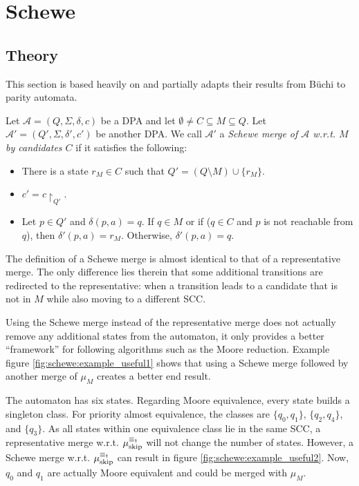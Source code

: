 
\chapter{Schewe}
\label{chap:schewe}

\section{Theory}

This section is based heavily on \cite{Schewe2010} and partially adapts their results from B\"uchi to parity automata.

\begin{defn}
		Let $\mathcal{A} = (Q, \Sigma, \delta, c)$ be a DPA and let $\emptyset \neq C \subseteq M \subseteq Q$. Let $\mathcal{A}' = (Q', \Sigma, \delta', c')$ be another DPA. We call $\mathcal{A}'$ a \emph{Schewe merge of $\mathcal{A}$ w.r.t. $M$ by candidates $C$} if it satisfies the following:
	\begin{itemize}
		\item There is a state $r_M \in C$ such that $Q' = (Q \setminus M) \cup \{r_M\}$.
		\item $c' = c\upharpoonright_{Q'}$.
		\item Let $p \in Q'$ and $\delta(p, a) = q$. If $q \in M$ or if ($q \in C$ and $p$ is not reachable from $q$), then $\delta'(p, a) = r_M$. Otherwise, $\delta'(p, a) = q$. 
	\end{itemize}
\end{defn}

The definition of a Schewe merge is almost identical to that of a representative merge. The only difference lies therein that some additional transitions are redirected to the representative: when a transition leads to a candidate that is not in $M$ while also moving to a different SCC.

Using the Schewe merge instead of the representative merge does not actually remove any additional states from the automaton, it only provides a better \enquote{framework} for following algorithms such as the Moore reduction. Example figure \ref{fig:schewe:example_useful1} shows that using a Schewe merge followed by another merge of $\mu_M$ creates a better end result.

The automaton has six states. Regarding Moore equivalence, every state builds a singleton class. For priority almost equivalence, the classes are $\{q_0, q_1\}$, $\{q_2, q_4\}$, and $\{q_3\}$. As all states within one equivalence class lie in the same SCC, a representative merge w.r.t. $\mu_\text{skip}^{\equiv_\text{\Ankh}}$ will not change the number of states. However, a Schewe merge w.r.t. $\mu_\text{skip}^{\equiv_\text{\Ankh}}$ can result in figure \ref{fig:schewe:example_useful2}. Now, $q_0$ and $q_1$ are actually Moore equivalent and could be merged with $\mu_M$.

